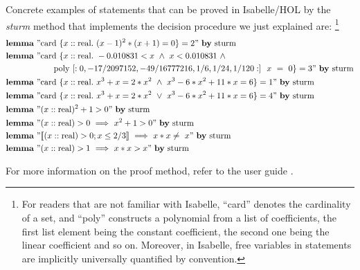 \documentclass[11pt,a4paper,oneside]{article}
\newcommand{\ilemma}{\textbf{lemma}}
\newcommand{\card}{\textrm{card}}
\newcommand{\real}{\textrm{real}}
\newcommand{\isabellehol}{\mbox{Isabelle}\slash HOL\xspace}
\begin{document}
Concrete examples of statements that can be proved in \isabellehol by the \emph{sturm} method that implements the decision procedure we just explained are:
\footnote{For readers that are not familiar with Isabelle, \enquote{card} denotes the cardinality of a set, and \enquote{poly} constructs a polynomial from a list of coefficients, the first list element being the constant coefficient, the second one being the linear coefficient and so on. Moreover, in Isabelle, free variables in statements are implicitly universally quantified by convention.}
\begin{align*}
&\ilemma\ "\card\ \{x::\real.\ (x - 1)^2 * (x + 1) = 0\} = 2"\ \textrm{\textbf{by}\ sturm}\\
&\ilemma\ "\mathrm{card}\ \{x::\mathrm{real}.\ -0.010831 < x\ \wedge\ x < 0.010831\ \wedge\\
&\hskip20mm \mathrm{poly}\ [:0, -17/2097152, -49/16777216, 1/6, 1/24, 1/120:]\ \ x\ =\ 0\} = 3"\ \textrm{\textbf{by}\ sturm}\\
&\ilemma\ "\card\ \{x::\real.\ x^3 + x = 2*x^2\ \wedge\ x^3-6*x^2+11*x=6\} = 1"\ \textrm{\textbf{by}\ sturm}\\
&\ilemma\ "\card\ \{x::\real.\ x^3 + x = 2*x^2\ \vee\ x^3-6*x^2+11*x=6\} = 4"\ \textrm{\textbf{by}\ sturm}\\
&\ilemma\ "(x::\real)^2+1 > 0"\ \textrm{\textbf{by}\ sturm}\\
&\ilemma\ "(x::\real) > 0\ \Longrightarrow\ x^2+1 > 0"\ \textrm{\textbf{by}\ sturm}\\
&\ilemma\ "\llbracket (x::\real) > 0; x \leq 2/3\rrbracket\ \Longrightarrow\ x*x \neq\ x"\ \textrm{\textbf{by}\ sturm}\\
&\ilemma\ "(x::\real) > 1\ \Longrightarrow\ x*x > x"\ \textrm{\textbf{by}\ sturm}\\
\end{align*}

For more information on the proof method, refer to the user guide \cite{sturm_userguide}.

\printbibliography
\end{document}
